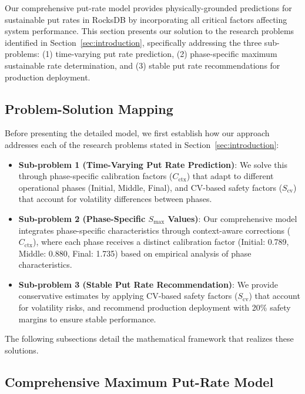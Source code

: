 \documentclass[11pt]{article}
\begin{document}
Our comprehensive put-rate model provides physically-grounded predictions for sustainable put rates in RocksDB by incorporating all critical factors affecting system performance. This section presents our solution to the research problems identified in Section~\ref{sec:introduction}, specifically addressing the three sub-problems: (1) time-varying put rate prediction, (2) phase-specific maximum sustainable rate determination, and (3) stable put rate recommendations for production deployment.

\subsection{Problem-Solution Mapping}

Before presenting the detailed model, we first establish how our approach addresses each of the research problems stated in Section~\ref{sec:introduction}:

\begin{itemize}
    \item \textbf{Sub-problem 1 (Time-Varying Put Rate Prediction)}: We solve this through phase-specific calibration factors ($C_{\text{ctx}}$) that adapt to different operational phases (Initial, Middle, Final), and CV-based safety factors ($S_{\text{cv}}$) that account for volatility differences between phases.
    
    \item \textbf{Sub-problem 2 (Phase-Specific $S_{\max}$ Values)}: Our comprehensive model integrates phase-specific characteristics through context-aware corrections ($C_{\text{ctx}}$), where each phase receives a distinct calibration factor (Initial: 0.789, Middle: 0.880, Final: 1.735) based on empirical analysis of phase characteristics.
    
    \item \textbf{Sub-problem 3 (Stable Put Rate Recommendation)}: We provide conservative estimates by applying CV-based safety factors ($S_{\text{cv}}$) that account for volatility risks, and recommend production deployment with 20\% safety margins to ensure stable performance.
\end{itemize}

The following subsections detail the mathematical framework that realizes these solutions.

\subsection{Comprehensive Maximum Put-Rate Model}
\end{document}
